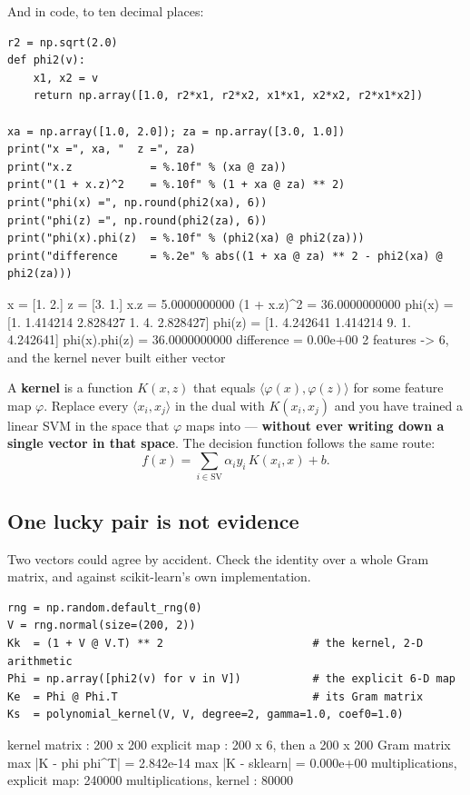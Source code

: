 \documentclass[11pt]{article}
\begin{document}
And in code, to ten decimal places:

\begin{lstlisting}
r2 = np.sqrt(2.0)
def phi2(v):
    x1, x2 = v
    return np.array([1.0, r2*x1, r2*x2, x1*x1, x2*x2, r2*x1*x2])

xa = np.array([1.0, 2.0]); za = np.array([3.0, 1.0])
print("x =", xa, "  z =", za)
print("x.z            = %.10f" % (xa @ za))
print("(1 + x.z)^2    = %.10f" % (1 + xa @ za) ** 2)
print("phi(x) =", np.round(phi2(xa), 6))
print("phi(z) =", np.round(phi2(za), 6))
print("phi(x).phi(z)  = %.10f" % (phi2(xa) @ phi2(za)))
print("difference     = %.2e" % abs((1 + xa @ za) ** 2 - phi2(xa) @ phi2(za)))
\end{lstlisting}
\begin{codeout}
x = [1. 2.]   z = [3. 1.]
x.z            = 5.0000000000
(1 + x.z)^2    = 36.0000000000
phi(x) = [1.       1.414214 2.828427 1.       4.       2.828427]
phi(z) = [1.       4.242641 1.414214 9.       1.       4.242641]
phi(x).phi(z)  = 36.0000000000
difference     = 0.00e+00
2 features -> 6, and the kernel never built either vector
\end{codeout}

\begin{keyidea}
A \textbf{kernel} is a function $K(x,z)$ that equals
$\langle \varphi(x), \varphi(z)\rangle$ for some feature map $\varphi$.
Replace every $\langle x_i, x_j\rangle$ in the dual with $K(x_i, x_j)$ and you
have trained a linear SVM in the space that $\varphi$ maps into ---
\textbf{without ever writing down a single vector in that space}. The decision
function follows the same route:
\[
  f(x) = \sum_{i \in \mathrm{SV}} \alpha_i y_i\,K(x_i, x) + b .
\]
\end{keyidea}

\subsection{One lucky pair is not evidence}

Two vectors could agree by accident. Check the identity over a whole Gram
matrix, and against scikit-learn's own implementation.

\begin{lstlisting}
rng = np.random.default_rng(0)
V = rng.normal(size=(200, 2))
Kk  = (1 + V @ V.T) ** 2                       # the kernel, 2-D arithmetic
Phi = np.array([phi2(v) for v in V])           # the explicit 6-D map
Ke  = Phi @ Phi.T                              # its Gram matrix
Ks  = polynomial_kernel(V, V, degree=2, gamma=1.0, coef0=1.0)
\end{lstlisting}
\begin{codeout}
kernel matrix       : 200 x 200
explicit map        : 200 x 6, then a 200 x 200 Gram matrix
max |K - phi phi^T| = 2.842e-14
max |K - sklearn|   = 0.000e+00
multiplications, explicit map: 240000
multiplications, kernel      : 80000
\end{codeout}
\end{document}
